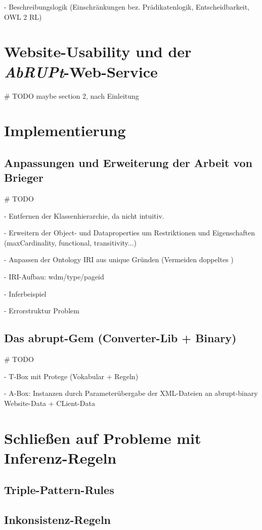 \documentclass[runningheads,a4paper]{llncs}
\begin{document}
- Beschreibungslogik (Einschränkungen bez. Prädikatenlogik, Entscheidbarkeit, OWL 2 RL)

\newpage

\section{Website-Usability und der \textit{AbRUPt}-Web-Service}

\# TODO maybe section 2, nach Einleitung
\section{Implementierung}

\subsection{Anpassungen und Erweiterung der Arbeit von Brieger}
\# TODO

- Entfernen der Klassenhierarchie, da nicht intuitiv.

- Erweitern der Object- und Dataproperties um Restriktionen und Eigenschaften (maxCardinality, functional, transitivity...)

- Anpassen der Ontology IRI aus unique Gründen (Vermeiden doppeltes )

- IRI-Aufbau: {wdm}/{type}/{page}{id}

- Inferbeispiel

- Errorstruktur
Problem
\subsection{Das abrupt-Gem (Converter-Lib + Binary)}
\# TODO

- T-Box mit Protege (Vokabular + Regeln)

- A-Box: Instanzen durch Parameterübergabe der XML-Dateien an abrupt-binary Website-Data + CLient-Data

\newpage

\section{Schließen auf Probleme mit Inferenz-Regeln}
\subsection{Triple-Pattern-Rules}
\subsection{Inkonsistenz-Regeln}
\end{document}

